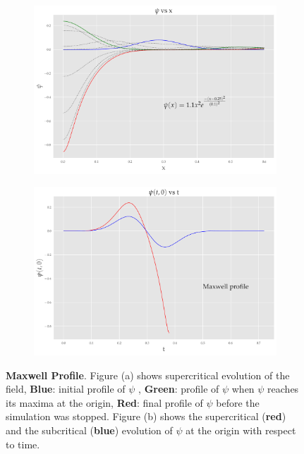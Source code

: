 \begin{figure}
    \centering
    \begin{subfigure}[b]{0.85\textwidth}
        \includegraphics[width=1\linewidth]{images/super_mod.pdf}
        \caption{}
        \label{fig:modified_gaussian}
    \end{subfigure}

    \begin{subfigure}[b]{0.85\textwidth}
        \includegraphics[width=1\linewidth]{images/at0_mod.pdf}
        \caption{}
        \label{fig:at0_modified_gaussian}
    \end{subfigure}
    \caption[Modified Gaussian profile field evolution]{\textbf{Maxwell Profile}. Figure (a) shows supercritical evolution of the field, \textbf{Blue}: initial profile of $\psi$ , \textbf{Green}: profile of $\psi$ when $\psi$ reaches its maxima at the origin, \textbf{Red}: final profile of $\psi$ before the simulation was stopped. Figure (b) shows the supercritical (\textbf{red}) and the subcritical (\textbf{blue}) evolution of $\psi$ at the origin with respect to time.}
\end{figure}

